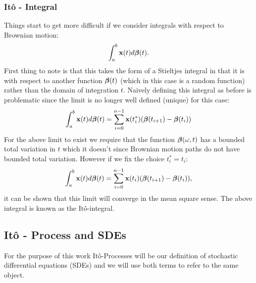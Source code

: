 \documentclass[a4paper,12pt,twoside,openright]{report}
\theoremstyle{definition}
\begin{document}
\subsubsection{Itô  - Integral}
Things start to get more difficult if we consider integrals with respect to Brownian motion:
\begin{align}\label{eq:brownian_integral}
    \int_{a}^b {\mathbf{x}}(t) d{\bm{\beta}}(t).
\end{align}
First thing to note is that this takes the form of a Stieltjes integral in that it is with respect to another function ${\bm{\beta}}(t)$ (which in this case is a random function) rather than the domain of integration $t$. Naively defining this integral as before is problematic since the limit is no longer well defined (unique) for this case:
\begin{align}\label{eq:brownian_integral_bad}
    \int_{a}^b {\mathbf{x}}(t) d{\bm{\beta}}(t) = \sum_{i=0}^{n-1} {\mathbf{x}}(t^{*}_i)({\bm{\beta}}(t_{i+1}) - {\bm{\beta}}(t_i))
\end{align}
For the above limit to exist we require that the function ${\bm{\beta}}(\omega, t)$ has a bounded total variation in $t$ which it doesn't since Brownian motion paths do not have bounded total variation. However if we fix the choice $t_i^{*} = t_i$:
\begin{align}\label{eq:ito_integral}
    \int_{a}^b {\mathbf{x}}(t) d{\bm{\beta}}(t) = \sum_{i=0}^{n-1} {\mathbf{x}}(t_i)({\bm{\beta}}(t_{i+1}) - {\bm{\beta}}(t_i)),
\end{align}
it can be shown that this limit will converge in the mean square sense. The above integral is known as the Itô-integral.
\subsection{Itô  - Process and SDEs}

For the purpose of this work Itô-Processes will be our definition of stochastic differential equations (SDEs) and we will use both terms to refer to the same object.
\end{document}
